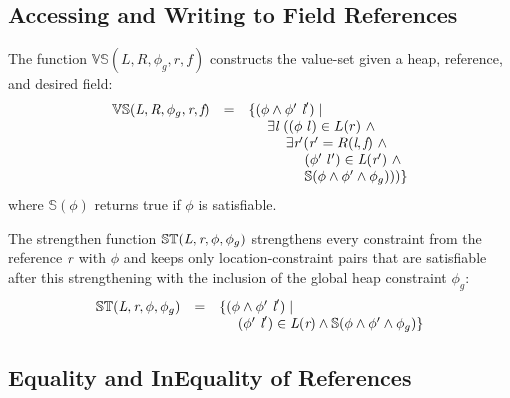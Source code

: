 


%


\subsection{Accessing and Writing to Field References}

\begin{definition}
\label{def:VS}
The function $\mathbb{VS}(L,R,\phi_g,r,f)$ constructs the value-set given a
heap, reference, and desired field:
\[
\begin{array}{rcl}
  \mathbb{VS}(\cfgnt{L},\cfgnt{R},\phi_g,\cfgnt{r},\cfgnt{f}) & = & \{(\phi\wedge\phi^\prime\ \cfgnt{l}^\prime) \mid \\
  & & \ \ \ \ \exists \cfgnt{l}\ ((\phi\ l) \in L(r)\ \wedge \\
  & & \ \ \ \ \ \ \ \ \exists \cfgnt{r}^\prime ( \cfgnt{r}^\prime = R(\cfgnt{l},\cfgnt{f})\ \wedge \\
  & & \ \ \ \ \ \ \ \ \ \ \ \ (\phi^\prime\ l^\prime) \in \cfgnt{L}(\cfgnt{r}^\prime)\ \wedge\\
  & & \ \ \ \ \ \ \ \ \ \ \ \ \mathbb{S}(\phi\wedge\phi^\prime\wedge \phi_g)))\}
\end{array}
\]
where $\mathbb{S}(\phi)$ returns true if $\phi$ is satisfiable.
\end{definition}

\begin{definition}
\label{def:ST}
The strengthen function $\mathbb{ST}(\emph{L},\emph{r},\phi,\phi_g)$ strengthens every
constraint from the reference $\emph{r}$ with $\phi$ and keeps only location-constraint
pairs that are satisfiable after this strengthening with the inclusion of the global heap constraint $\phi_g$:
\[
\begin{array}{rcl} 
\mathbb{ST}(\emph{L},\emph{r},\phi,\phi_g) & = & \{ (\phi\wedge\phi^\prime\ \emph{l}^\prime) \mid  \\
& & \ \ \ \ (\phi^\prime\ \emph{l}^\prime)\in \emph{L}(\emph{r})\wedge\mathbb{S}(\phi\wedge\phi^\prime\wedge\phi_g) \}
\end{array}
\]
\end{definition}



\subsection{Equality and InEquality of References}




